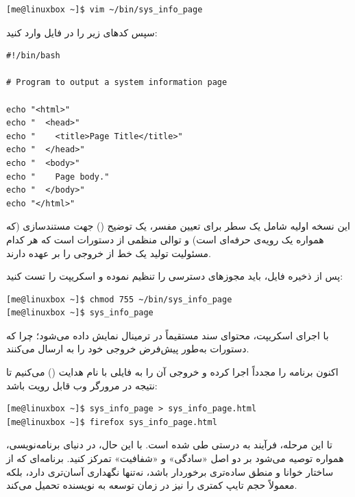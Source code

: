 \begin{latin}
\begin{lstlisting}
[me@linuxbox ~]$ vim ~/bin/sys_info_page
\end{lstlisting}
\end{latin}

سپس کدهای زیر را در فایل وارد کنید:

\begin{latin}
\begin{lstlisting}
#!/bin/bash

# Program to output a system information page

echo "<html>"
echo "  <head>"
echo "    <title>Page Title</title>"
echo "  </head>"
echo "  <body>"
echo "    Page body."
echo "  </body>"
echo "</html>"
\end{lstlisting}
\end{latin}

این نسخه اولیه شامل یک سطر  برای تعیین مفسر، یک توضیح () جهت مستندسازی (که همواره یک رویه‌ی حرفه‌ای است) و توالی منظمی از دستورات  است که هر کدام مسئولیت تولید یک خط از خروجی را بر عهده دارند.

پس از ذخیره فایل، باید مجوزهای دسترسی را تنظیم نموده و اسکریپت را تست کنید:

\begin{latin}
\begin{lstlisting}
[me@linuxbox ~]$ chmod 755 ~/bin/sys_info_page
[me@linuxbox ~]$ sys_info_page
\end{lstlisting}
\end{latin}

با اجرای اسکریپت، محتوای سند  مستقیماً در ترمینال نمایش داده می‌شود؛ چرا که دستورات  به‌طور پیش‌فرض خروجی خود را به  ارسال می‌کنند.

اکنون برنامه را مجدداً اجرا کرده و خروجی آن را به فایلی با نام  هدایت () می‌کنیم تا نتیجه در مرورگر وب قابل رویت باشد:

\begin{latin}
\begin{lstlisting}
[me@linuxbox ~]$ sys_info_page > sys_info_page.html
[me@linuxbox ~]$ firefox sys_info_page.html
\end{lstlisting}
\end{latin}

تا این مرحله، فرآیند به درستی طی شده است. با این حال، در دنیای برنامه‌نویسی، همواره توصیه می‌شود بر دو اصل «سادگی» و «شفافیت» تمرکز کنید. برنامه‌ای که از ساختار خوانا و منطق ساده‌تری برخوردار باشد، نه‌تنها نگهداری آسان‌تری دارد، بلکه معمولاً حجم تایپ کمتری را نیز در زمان توسعه به نویسنده تحمیل می‌کند.

